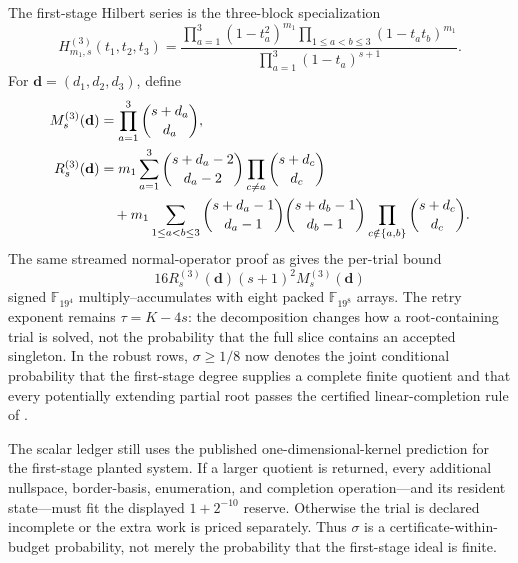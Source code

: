 \documentclass[11pt]{article}
\newcommand{\F}{\mathbb F}
\begin{document}
The first-stage Hilbert series is the three-block specialization
\begin{equation}\label{eq:hilbert-series-three}
 H^{(3)}_{m_1,s}(t_1,t_2,t_3)=
 \frac{\prod_{a=1}^{3}(1-t_a^2)^{m_1}
       \prod_{1\le a<b\le3}(1-t_at_b)^{m_1}}
      {\prod_{a=1}^{3}(1-t_a)^{s+1}}.
\end{equation}
For $\mathbf d=(d_1,d_2,d_3)$, define
\begin{align}
 M^{(3)}_s(\mathbf d)
 &=\prod_{a=1}^{3}\binom{s+d_a}{d_a},
 \label{eq:three-plus-one-columns}\\
 R^{(3)}_s(\mathbf d)
 &=m_1\sum_{a=1}^{3}
   \binom{s+d_a-2}{d_a-2}\prod_{c\ne a}\binom{s+d_c}{d_c}
 \notag\\
 &\quad{}+m_1\sum_{1\le a<b\le3}
   \binom{s+d_a-1}{d_a-1}\binom{s+d_b-1}{d_b-1}
   \prod_{c\notin\{a,b\}}\binom{s+d_c}{d_c}.
 \label{eq:three-plus-one-rows}
\end{align}
The same streamed normal-operator proof as
 gives the per-trial bound
\begin{equation}\label{eq:three-plus-one-stream-work}
 16R^{(3)}_s(\mathbf d)(s+1)^2M^{(3)}_s(\mathbf d)
\end{equation}
signed $\F_{19^4}$ multiply--accumulates with eight packed
$\F_{19^8}$ arrays.  The retry exponent remains $\tau=K-4s$: the decomposition
changes how a root-containing trial is solved, not the probability that the
full slice contains an accepted singleton.  In the robust rows, $\sigma\ge1/8$
now denotes the joint conditional probability that the first-stage degree
supplies a complete finite quotient and that every potentially extending
partial root passes the certified linear-completion rule of
.

The scalar ledger still uses the published one-dimensional-kernel prediction
for the first-stage planted system.  If a larger quotient is returned, every
additional nullspace, border-basis, enumeration, and completion operation---and
its resident state---must fit the displayed $1+2^{-10}$ reserve.  Otherwise the
trial is declared incomplete or the extra work is priced separately.  Thus
$\sigma$ is a certificate-within-budget probability, not merely the probability
that the first-stage ideal is finite.
\end{document}
